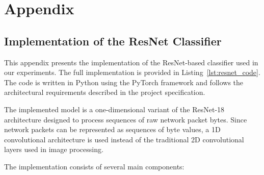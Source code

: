 \chapter{Appendix}

\section{Implementation of the ResNet Classifier}

This appendix presents the implementation of the ResNet-based classifier used in our experiments. The full implementation is provided in Listing~\ref{lst:resnet_code}. The code is written in Python using the PyTorch framework and follows the architectural requirements described in the project specification. 

The implemented model is a one-dimensional variant of the ResNet-18 architecture designed to process sequences of raw network packet bytes. Since network packets can be represented as sequences of byte values, a 1D convolutional architecture is used instead of the traditional 2D convolutional layers used in image processing.

The implementation consists of several main components:

